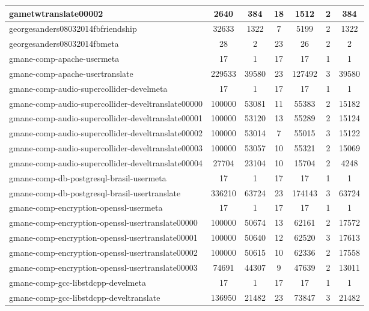 \begin{table*}[h!]
\begin{center}
\begin{tabular}{| l | c | c | c | c | c | c |}
gametwtranslate00002 & 2640  & 384  & 18  & 1512  & 2  & 384 \\\hline
georgesanders08032014fbfriendship & 32633  & 1322  & 7  & 5199  & 2  & 1322 \\\hline
georgesanders08032014fbmeta & 28  & 2  & 23  & 26  & 2  & 2 \\\hline
gmane-comp-apache-usermeta & 17  & 1  & 17  & 17  & 1  & 1 \\\hline
gmane-comp-apache-usertranslate & 229533  & 39580  & 23  & 127492  & 3  & 39580 \\\hline
gmane-comp-audio-supercollider-develmeta & 17  & 1  & 17  & 17  & 1  & 1 \\\hline
gmane-comp-audio-supercollider-develtranslate00000 & 100000  & 53081  & 11  & 55383  & 2  & 15182 \\\hline
gmane-comp-audio-supercollider-develtranslate00001 & 100000  & 53120  & 13  & 55289  & 2  & 15124 \\\hline
gmane-comp-audio-supercollider-develtranslate00002 & 100000  & 53014  & 7  & 55015  & 3  & 15122 \\\hline
gmane-comp-audio-supercollider-develtranslate00003 & 100000  & 53057  & 10  & 55321  & 2  & 15069 \\\hline
gmane-comp-audio-supercollider-develtranslate00004 & 27704  & 23104  & 10  & 15704  & 2  & 4248 \\\hline
gmane-comp-db-postgresql-brasil-usermeta & 17  & 1  & 17  & 17  & 1  & 1 \\\hline
gmane-comp-db-postgresql-brasil-usertranslate & 336210  & 63724  & 23  & 174143  & 3  & 63724 \\\hline
gmane-comp-encryption-openssl-usermeta & 17  & 1  & 17  & 17  & 1  & 1 \\\hline
gmane-comp-encryption-openssl-usertranslate00000 & 100000  & 50674  & 13  & 62161  & 2  & 17572 \\\hline
gmane-comp-encryption-openssl-usertranslate00001 & 100000  & 50640  & 12  & 62520  & 3  & 17613 \\\hline
gmane-comp-encryption-openssl-usertranslate00002 & 100000  & 50615  & 10  & 62336  & 2  & 17558 \\\hline
gmane-comp-encryption-openssl-usertranslate00003 & 74691  & 44307  & 9  & 47639  & 2  & 13011 \\\hline
gmane-comp-gcc-libstdcpp-develmeta & 17  & 1  & 17  & 17  & 1  & 1 \\\hline
gmane-comp-gcc-libstdcpp-develtranslate & 136950  & 21482  & 23  & 73847  & 3  & 21482 \\\hline

\end{tabular}
\end{center}
\end{table*}
